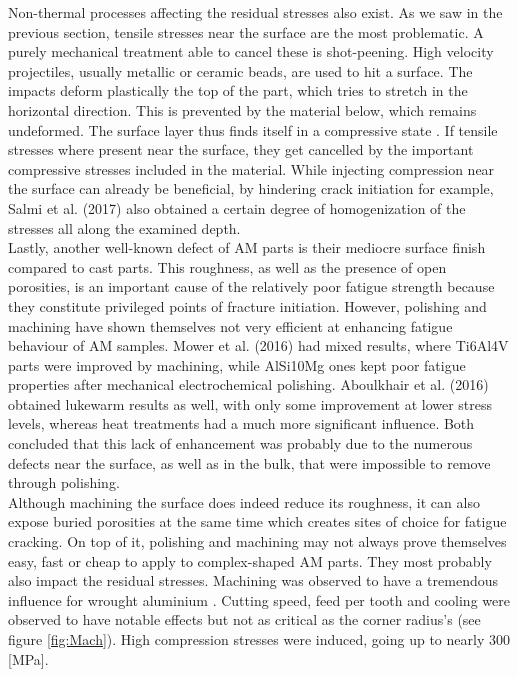 Non-thermal processes affecting the residual stresses also exist. As we saw in the previous section, tensile stresses near the surface are the most problematic. A purely mechanical treatment able to cancel these is shot-peening. High velocity projectiles, usually metallic or ceramic beads, are used to hit a surface. The impacts deform plastically the top of the part, which tries to stretch in the horizontal direction. This is prevented by the material below, which remains undeformed. The surface layer thus finds itself in a compressive state \cite{Vrancken2016}. If tensile stresses where present near the surface, they get cancelled by the important compressive stresses included in the material. While injecting compression near the surface can already be beneficial, by hindering crack initiation for example, Salmi et al. (2017) \cite{Salmi2017} also obtained a certain degree of homogenization of the stresses all along the examined depth. \\

Lastly, another well-known defect of AM parts is their mediocre surface finish compared to cast parts. This roughness, as well as the presence of open porosities, is an important cause of the relatively poor fatigue strength because they constitute privileged points of fracture initiation. However, polishing and machining have shown themselves not very efficient at enhancing fatigue behaviour of AM samples. Mower et al. (2016)\cite{MOWER2016198} had mixed results, where Ti6Al4V parts were improved by machining, while AlSi10Mg ones kept poor fatigue properties after mechanical electrochemical polishing. Aboulkhair et al. (2016) \cite{ABOULKHAIR2016bis} obtained lukewarm results as well, with only some improvement at lower stress levels, whereas heat treatments had a much more significant influence. Both concluded that this lack of enhancement was probably due to the numerous defects near the surface, as well as in the bulk, that were impossible to remove through polishing. \\

Although machining the surface does indeed reduce its roughness, it can also expose buried porosities at the same time which creates sites of choice for fatigue cracking. On top of it, polishing and machining may not always prove themselves easy, fast or cheap to apply to complex-shaped AM parts. They most probably also impact the residual stresses. Machining was observed to have a tremendous influence for wrought aluminium \parencite{Denkena2007}. Cutting speed, feed per tooth and cooling were observed to have notable effects but not as critical as the corner radius's (see figure \ref{fig:Mach}). High compression stresses were induced, going up to nearly 300 [MPa].\\

